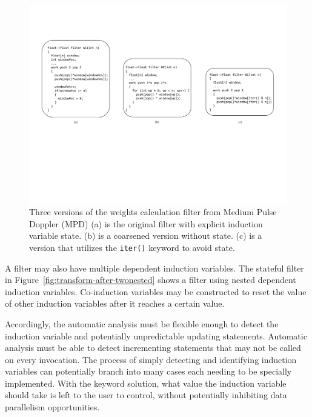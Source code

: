 \begin{figure}[t!]
\centering
\includegraphics[width=6.5in]{figures/weights-calc-example.pdf}
\caption{Three versions of the weights calculation filter from Medium Pulse Doppler (MPD) (a) is the original filter with explicit induction variable state.  (b) is a coarsened version without state. (c) is a version that utilizes the {\tt iter()} keyword to avoid state.\protect\label{fig:wc-example}}
\end{figure}


A filter may also have multiple dependent induction variables.  
The stateful filter in Figure~\ref{fig:transform-after-twonested} shows
a filter using nested dependent induction variables.  
Co-induction variables may be constructed to reset the value of 
other induction variables after it reaches a certain value.  

Accordingly, the automatic analysis must be flexible enough to detect 
the induction variable and potentially unpredictable updating statements.  Automatic analysis must be able 
to detect incrementing statements that may not be called on every invocation. The
process of simply detecting and identifying induction variables can 
potentially branch into many cases each needing to be specially implemented.
With the keyword solution, what value the induction variable should take
is left to the user to control, without potentially inhibiting data parallelism
opportunities.


